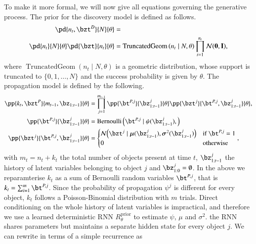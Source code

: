 To make it more formal, we will now give all equations governing the generative process. The prior for the discovery model is defined as follows.
\begin{equation}
\begin{aligned}
    \pd{n_t, \bzt^D}{N}{\theta} &=\\
    \pd{n_t}{N}{\theta} \pd{\bzt}{n_t}{\theta} 
    &= \operatorname{TruncatedGeom} \left( n_t \mid N, \theta \right)
    \prod_{i=1}^{n_t} \gauss{\bf{0}, I},
\end{aligned}
\end{equation}
where $\operatorname{TruncatedGeom} \left( n_t \mid N, \theta \right)$ is a geometric distribution, whose support is truncated to $\{0, 1, \dots, N\}$ and the success probability is given by $\theta$. The propagation model is defined by the following.
\begin{equation}
\begin{aligned}
    \pp{k_t, \bzt^P}{m_{t-1}, \bz_{1:t-1}}{\theta} &= 
    \prod_{j=1}^{m_{t-1}} \pp{\bt^{P, j}}{\bz_{1:t-1}^j}{\theta} \pp{\bzt^j}{ \bt^{P, j}, \bz_{1:t-1}^j}{\theta},\\
%    
     \pp{\bt^{P, j}}{\bz_{1:t-1}^j}{\theta} &= 
     \mathrm{Bernoulli}
     \left(
        \bt^{P, j} \mid \psi( \bz_{1:t-1}^j),
    \right)\\
%    
    \pp{\bzt^j}{ \bt^{P, j}, \bz_{1:t-1}^j}{\theta} &=
    \begin{cases}
    \gauss{\bzt^j \mid \bm{\mu} (\bz_{1:t-1}^j), \bm{\sigma}^2(\bz_{1:t-1}^j)} & \text{if } \bt^{P, j} = 1\\
    0 & \text{otherwise}
    \end{cases}
    ,
\end{aligned}
\label{eq:prop_prior}
\end{equation}
with $m_t = n_t + k_t$ the total number of objects present at time $t$, $\bz_{1:t-1}^j$ the history of latent variables belonging to object $j$ and $\bz_{1:0}^j = \emptyset$. In the above we reparamterise $k_t$ as a sum of Bernoulli random variables $\bt^{P, j}$, that is $k_t = \sum_{i=1}^m \bt^{P, j}$. Since the probability of propagation $\psi^j$ is different for every object, $k_t$ follows a Poisson-Binomial distribution with $m$ trials. Direct conditioning on the whole history of latent variables is impractical, and therefore we use a learned deterministic RNN $R_\theta^\mathrm{prior}$ to estimate $\psi$, $\mu$ and $\sigma^2$. the RNN shares parameters but maintains a separate hidden state for every object $j$. We can rewrite  in terms of a simple recurrence as
